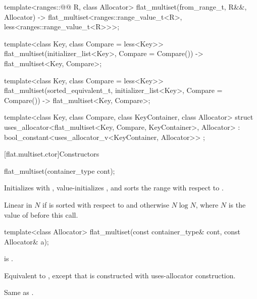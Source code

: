 \begin{codeblock}
{   template<ranges::@@ R, class Allocator>
     flat_multiset(from_range_t, R&&, Allocator)
       -> flat_multiset<ranges::range_value_t<R>, less<ranges::range_value_t<R>>>;

  template<class Key, class Compare = less<Key>>
    flat_multiset(initializer_list<Key>, Compare = Compare())
      -> flat_multiset<Key, Compare>;

  template<class Key, class Compare = less<Key>>
  flat_multiset(sorted_equivalent_t, initializer_list<Key>, Compare = Compare())
      -> flat_multiset<Key, Compare>;

  template<class Key, class Compare, class KeyContainer, class Allocator>
    struct uses_allocator<flat_multiset<Key, Compare, KeyContainer>, Allocator>
      : bool_constant<uses_allocator_v<KeyContainer, Allocator>> { };
}
\end{codeblock}

[flat.multiset.ctor]{Constructors}

%
\begin{itemdecl}
flat_multiset(container_type cont);
\end{itemdecl}

\begin{itemdescr}
\pnum
\effects
Initializes  with ,
value-initializes , and
sorts the range  with respect to .

\pnum
\complexity
Linear in $N$ if  is sorted with respect to  and
otherwise $N \log N$, where $N$ is the value of  before this call.
\end{itemdescr}

%
\begin{itemdecl}
template<class Allocator>
  flat_multiset(const container_type& cont, const Allocator& a);
\end{itemdecl}

\begin{itemdescr}
\pnum
\constraints
{} is .

\pnum
\effects
Equivalent to ,
except that  is constructed with
uses-allocator construction.

\pnum
\complexity
Same as .
\end{itemdescr}


